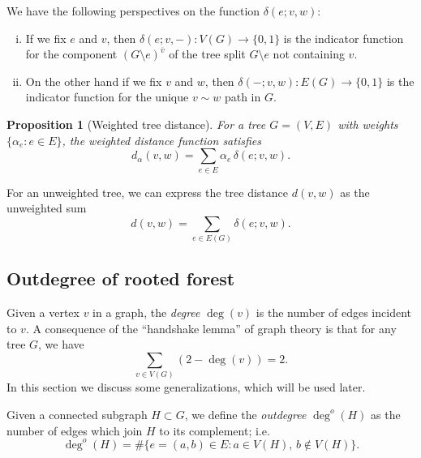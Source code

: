 \documentclass{amsart}
\newtheorem{prop}[thm]{Proposition}
\theoremstyle{definition}
\newcommand{\degout}{\deg^o}
\begin{document}
We have the following perspectives on the function $\delta(e; v,w)$:
\begin{enumerate}[(i)]
\item 
If we fix $e$ and $v$,
then $\delta(e;v, -) : V(G) \to \{0,1\}$ 
is the indicator function for the component 
$(G \setminus e)^{\overline v}$ of the tree split $G \setminus e$
not containing $v$.

\item 
On the other hand if we fix $v$ and $w$, then $\delta(-;v,w) : E(G) \to \{0,1\}$
is the indicator function for the unique $v \sim w$ path in $G$.

\end{enumerate}


\begin{prop}[Weighted tree distance]
\label{prop:distance-sum}
For a tree $G = (V,E)$ with weights $\{\alpha_e : e \in E\}$,
the weighted distance function satisfies
\[ d_\alpha(v,w) = \sum_{e \in E} \alpha_e \, \delta(e; v,w) .\]
\end{prop}

For an unweighted tree, we can express the tree distance $d(v,w)$ as the unweighted sum
\begin{equation*}
	d(v,w) = \sum_{e \in E(G)} \delta(e; v,w).
\end{equation*}


\subsection{Outdegree of rooted forest}

Given a vertex $v$ in a graph, the {\em degree} $\deg(v)$ is the number of edges incident to $v$.
A consequence of the ``handshake lemma'' of graph theory is that for any tree $G$, we have
\[
\sum_{v \in V(G)} (2 - \deg(v)) = 2.
\]
In this section we discuss some generalizations, which will be used later.

Given a connected subgraph $H \subset G$,
we define the {\em outdegree} $\degout(H)$ as the number of edges which join $H$ to its complement; i.e.
\begin{equation}
	\degout(H) = \#\{ e = (a,b) \in E : a \in V(H),\, b \not\in V(H)\}.
\end{equation}
\end{document}
